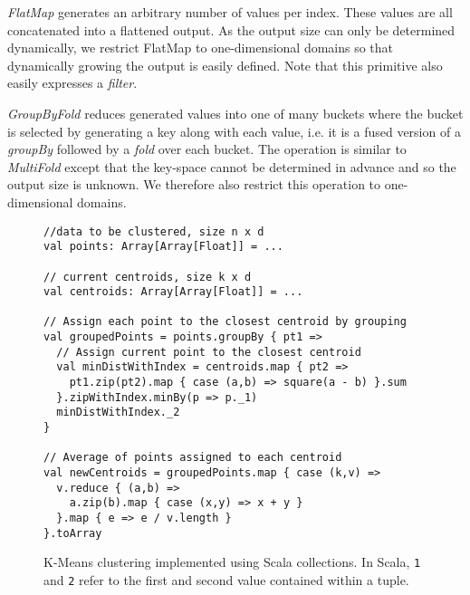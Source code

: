 \emph{FlatMap} generates an arbitrary number of values per index.
These values are all concatenated into a flattened output.
As the output size can only be determined dynamically, we restrict FlatMap to
one-dimensional domains so that dynamically growing the output is easily defined.
Note that this primitive also easily expresses a \emph{filter}.

\emph{GroupByFold} reduces generated values into one of many buckets where the bucket is selected by generating a key along with each value, i.e. it is a fused version of a \emph{groupBy} followed by a \emph{fold} over each bucket.
The operation is similar to \emph{MultiFold} except that the key-space cannot be determined in advance and so the output size is unknown.
We therefore also restrict this operation to one-dimensional domains.

\begin{figure}
\centering
\begin{lstlisting}[language=ScalaBig]
//data to be clustered, size n x d
val points: Array[Array[Float]] = ...

// current centroids, size k x d
val centroids: Array[Array[Float]] = ...

// Assign each point to the closest centroid by grouping
val groupedPoints = points.groupBy { pt1 =>
  // Assign current point to the closest centroid
  val minDistWithIndex = centroids.map { pt2 =>
    pt1.zip(pt2).map { case (a,b) => square(a - b) }.sum
  }.zipWithIndex.minBy(p => p._1)
  minDistWithIndex._2
}

// Average of points assigned to each centroid
val newCentroids = groupedPoints.map { case (k,v) =>
  v.reduce { (a,b) =>
    a.zip(b).map { case (x,y) => x + y }
  }.map { e => e / v.length }
}.toArray
\end{lstlisting}
\caption{K-Means clustering implemented using Scala collections. In Scala, \textunderscore\texttt{1} and \textunderscore\texttt{2} refer to the first and second value contained within a tuple.}
\label{fig:kmeans}
\end{figure}

